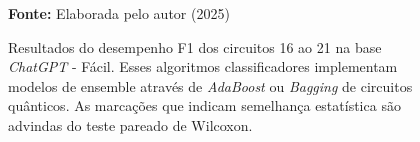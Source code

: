 \begin{figure}
\caption{Resultados do desempenho F1 dos circuitos 16 ao 21 na base \textit{ChatGPT} - Fácil. Esses algoritmos classificadores implementam modelos de ensemble através de \textit{AdaBoost} ou \textit{Bagging} de circuitos quânticos. As marcações que indicam semelhança estatística são advindas do teste pareado de Wilcoxon.}
\label{fig:f1:easy:g6}
     \centering
    \centering

      \par\medskip\ABNTEXfontereduzida\selectfont\textbf{Fonte:} Elaborada pelo autor (2025) \par\medskip
\end{figure}